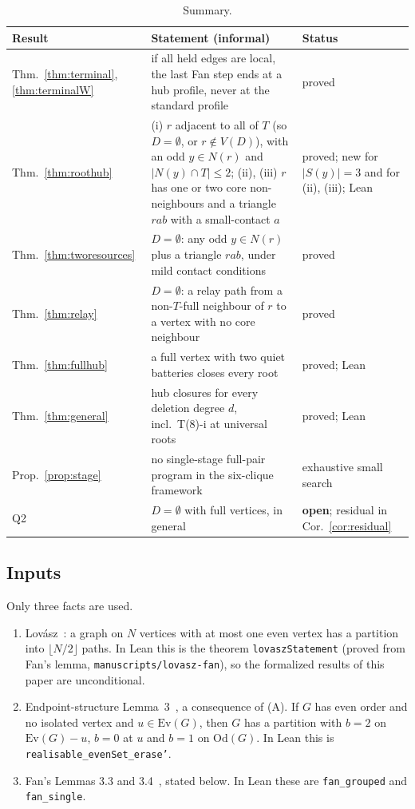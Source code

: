 \documentclass[11pt]{amsart}
\theoremstyle{definition}
\newcommand{\Ev}{\mathrm{Ev}}
\newcommand{\Od}{\mathrm{Od}}
\begin{document}
\begin{table}[ht]
\small
\begin{tabular}{p{2.3cm}p{8.6cm}p{2.9cm}}
\toprule
Result & Statement (informal) & Status\\
\midrule
Thm.~\ref{thm:terminal}, \ref{thm:terminalW} & if all held edges are local, the last Fan step ends at a hub profile, never at the standard profile & proved\\
Thm.~\ref{thm:roothub} & (i) $r$ adjacent to all of $T$ (so $D=\emptyset$, or $r\notin V(D)$), with an odd $y\in N(r)$ and $|N(y)\cap T|\le2$; (ii), (iii) $r$ has one or two core non-neighbours and a triangle $rab$ with a small-contact $a$ & proved; new for $|S(y)|=3$ and for (ii), (iii); Lean\\
Thm.~\ref{thm:tworesources} & $D=\emptyset$: any odd $y\in N(r)$ plus a triangle $rab$, under mild contact conditions & proved\\
Thm.~\ref{thm:relay} & $D=\emptyset$: a relay path from a non-$T$-full neighbour of $r$ to a vertex with no core neighbour & proved\\
Thm.~\ref{thm:fullhub} & a full vertex with two quiet batteries closes every root & proved; Lean\\
Thm.~\ref{thm:general} & hub closures for every deletion degree $d$, incl.\ T(8)-i at universal roots & proved; Lean\\
Prop.~\ref{prop:stage} & no single-stage full-pair program in the six-clique framework & exhaustive small search\\
\midrule
Q2 & $D=\emptyset$ with full vertices, in general & \textbf{open}; residual in Cor.~\ref{cor:residual}\\
\bottomrule
\end{tabular}
\caption{Summary.}\label{tab:summary}
\end{table}

\subsection*{Inputs} Only three facts are used.
\begin{enumerate}[label=(\Alph*)]
\item Lov\'asz~\cite{L68}: a graph on $N$ vertices with at most one even vertex has a partition into
$\lfloor N/2\rfloor$ paths. In Lean this is the theorem \texttt{lovaszStatement} (proved from Fan's lemma,
\texttt{manuscripts/lovasz-fan}), so the formalized results of this paper are unconditional.
\item Endpoint-structure Lemma~3~\cite{ES}, a consequence of (A). If $G$ has even order and no
isolated vertex and $u\in\Ev(G)$, then $G$ has a partition with $b=2$ on $\Ev(G)-u$, $b=0$ at $u$ and
$b=1$ on $\Od(G)$. In Lean this is \texttt{realisable\_evenSet\_erase'}.
\item Fan's Lemmas 3.3 and 3.4~\cite{Fan}, stated below. In Lean these are
\texttt{fan\_grouped} and \texttt{fan\_single}.
\end{enumerate}
\end{document}
